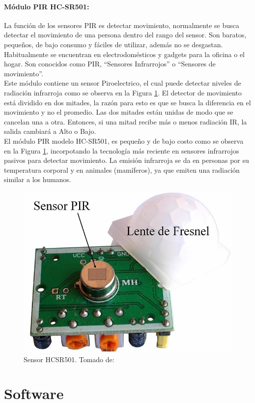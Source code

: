 \paragraph{Módulo PIR HC-SR501: }

La función de los sensores PIR es detectar movimiento, normalmente se busca detectar el movimiento de una persona dentro del rango del sensor. Son baratos, pequeños, de bajo consumo y fáciles de utilizar, además no se desgastan. Habitualmente se encuentran en electrodomésticos y gadgets para la oficina o el hogar. Son conocidos como PIR, ``Sensores Infrarrojos'' o ``Sensores de movimiento''.\\

Este módulo contiene un sensor Piroelectrico, el cual puede detectar niveles de radiación infrarroja como se observa en la Figura \ref{fig:sensor-hc-sr501-1000-m}. El detector de movimiento está dividido en dos mitades, la razón para esto es que se busca la diferencia en el movimiento y no el promedio. Las dos mitades están unidas de modo que se cancelan una a otra. Entonces, si una mitad recibe más o menos radiación IR, la salida cambiará a Alto o Bajo. \cite{PIR1}\\

El módulo PIR modelo HC-SR501, es pequeño y de bajo costo como se observa en la Figura \ref{fig:sensor-hc-sr501-1000-m}, incorpotando la tecnología más reciente en sensores infrarrojos pasivos para detectar movimiento. La emisión infrarroja se da en personas por su temperatura corporal y en animales (mamíferos), ya que emiten una radiación similar a los humanos. \cite{PIR2}

\begin{figure}[H]
	\centering
	\caption[Sensor HCSR501.]{Sensor HCSR501. Tomado de: \cite{PIR2}}
	\label{fig:sensor-hc-sr501-1000-m}
	\includegraphics[width=0.5\linewidth]{Imagenes/SENSOR-HC-SR501-1000-M}
\end{figure}

\section{Software}


